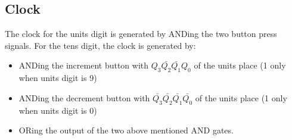 \documentclass{article}
\begin{document}
\subsection{Clock}
The clock for the units digit is generated by ANDing the two button press signals. For the tens digit, the clock is generated by:
\begin{itemize}
\item ANDing the increment button with $Q_3\bar{Q_2}\bar{Q_1}Q_0$ of the units place (1 only when units digit is 9)
\item ANDing the decrement button with $\bar{Q_3}\bar{Q_2}\bar{Q_1}\bar{Q_0}$ of the units place (1 only when units digit is 0)
\item ORing the output of the two above mentioned AND gates.
\end{itemize}
\end{document}
